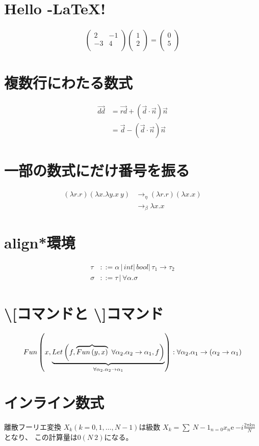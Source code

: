 \documentclass[a4j]{jsarticle}
\begin{document}
\section{Hello \AmS-\LaTeX !}
\begin{align}
 \left(
 \begin{array}{cc}
  2&-1 \\
  -3&4 \\
 \end{array}
 \right)
 \left(
 \begin{array}{c}
  1\\
  2\\
 \end{array}
 \right) = \left(
 \begin{array}{c}
  0\\
  5\\
 \end{array}
 \right)
\end{align}
\section{複数行にわたる数式}
\begin{align}
 \overrightarrow{dd} &= \overrightarrow{rd} + \left(\vec{d} \cdot
 \vec{n}\right)\vec{n}\label{eq:vectordd1}\\
 &= \vec{d} - \left(\vec{d} \cdot \vec{n} \right) \vec{n} \label{eq:vectordd2}
\end{align}

 \section{一部の数式にだけ番号を振る}
\begin{align}
 \left(\lambda r.r \right)
 \left(\lambda x. \lambda y.x~y \right)
 & \rightarrow_{\eta} 
 \left(\lambda r.r \right)
 \left(\lambda x.x \right)\nonumber \\
 & \rightarrow_{\beta}
 \lambda x.x
\end{align}

\section{align*環境}
\begin{align*}
 \tau &::= \alpha\, |\, int|\, bool|\, \tau_1 \rightarrow \tau_2 \\
 \sigma &::= \tau\, |\, \forall \alpha. \sigma
\end{align*}

\section{ \textbackslash [コマンドと \textbackslash ]コマンド}
\[
 Fun\left(x, \protect\underbrace{Let%
 \left
 (f, \protect\overbrace{Fun\left(y,x\right)}
 ~{\forall\alpha_2. \alpha_2 \rightarrow \alpha_1},
 f \right)}_%
 {\forall\alpha_2.\alpha_2 \rightarrow \alpha_1}
 \right)
 : \forall\alpha_2.\alpha_1\rightarrow
 \left(
 \alpha_2 \rightarrow \alpha_1
 \right)
\]

\section{インライン数式}
離散フーリエ変換
$X_k \left( k = 0 , 1 , \dots , N - 1 \right)$は級数
$X_k= \sum~{N-1}_{n=0}x_n \mathrm{e}~{-i\frac{2\pi kn}{N}}$となり、
この計算量は$\mathcal{0}\left(N~2\right)$になる。
\end{document}
